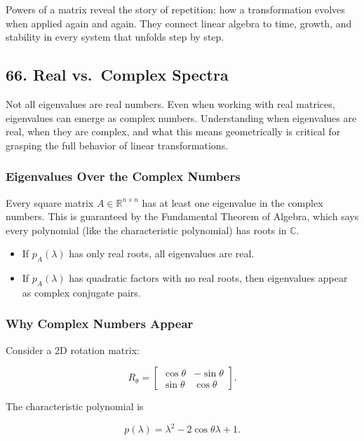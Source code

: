 \documentclass[
  letterpaper,
  DIV=11,
  numbers=noendperiod]{scrreprt}
\providecommand{\tightlist}{%
  \setlength{\itemsep}{0pt}\setlength{\parskip}{0pt}}
\begin{document}
Powers of a matrix reveal the story of repetition: how a transformation
evolves when applied again and again. They connect linear algebra to
time, growth, and stability in every system that unfolds step by step.

\subsection{66. Real vs.~Complex
Spectra}\label{real-vs.-complex-spectra}

Not all eigenvalues are real numbers. Even when working with real
matrices, eigenvalues can emerge as complex numbers. Understanding when
eigenvalues are real, when they are complex, and what this means
geometrically is critical for grasping the full behavior of linear
transformations.

\subsubsection{Eigenvalues Over the Complex
Numbers}\label{eigenvalues-over-the-complex-numbers}

Every square matrix \(A \in \mathbb{R}^{n \times n}\) has at least one
eigenvalue in the complex numbers. This is guaranteed by the Fundamental
Theorem of Algebra, which says every polynomial (like the characteristic
polynomial) has roots in \(\mathbb{C}\).

\begin{itemize}
\tightlist
\item
  If \(p_A(\lambda)\) has only real roots, all eigenvalues are real.
\item
  If \(p_A(\lambda)\) has quadratic factors with no real roots, then
  eigenvalues appear as complex conjugate pairs.
\end{itemize}

\subsubsection{Why Complex Numbers
Appear}\label{why-complex-numbers-appear}

Consider a 2D rotation matrix:

\[
R_\theta = \begin{bmatrix} \cos\theta & -\sin\theta \\ \sin\theta & \cos\theta \end{bmatrix}.
\]

The characteristic polynomial is

\[
p(\lambda) = \lambda^2 - 2\cos\theta \lambda + 1.
\]
\end{document}
